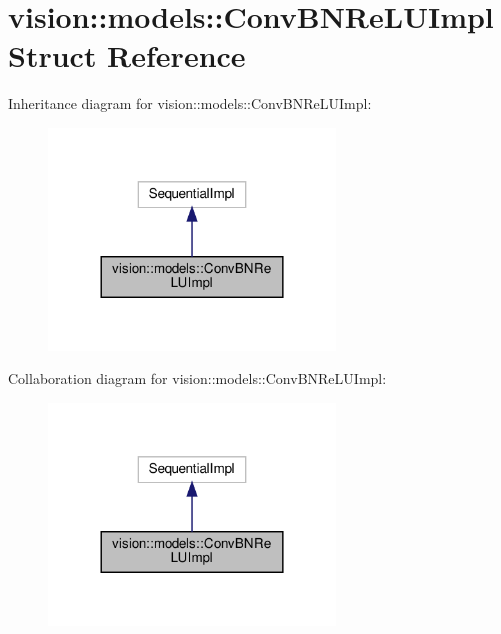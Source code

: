 \hypertarget{structvision_1_1models_1_1ConvBNReLUImpl}{}\section{vision\+:\+:models\+:\+:Conv\+B\+N\+Re\+L\+U\+Impl Struct Reference}
\label{structvision_1_1models_1_1ConvBNReLUImpl}


Inheritance diagram for vision\+:\+:models\+:\+:Conv\+B\+N\+Re\+L\+U\+Impl\+:
\nopagebreak
\begin{figure}[H]
\begin{center}
\leavevmode
\includegraphics[width=216pt]{structvision_1_1models_1_1ConvBNReLUImpl__inherit__graph}
\end{center}
\end{figure}


Collaboration diagram for vision\+:\+:models\+:\+:Conv\+B\+N\+Re\+L\+U\+Impl\+:
\nopagebreak
\begin{figure}[H]
\begin{center}
\leavevmode
\includegraphics[width=216pt]{structvision_1_1models_1_1ConvBNReLUImpl__coll__graph}
\end{center}
\end{figure}
